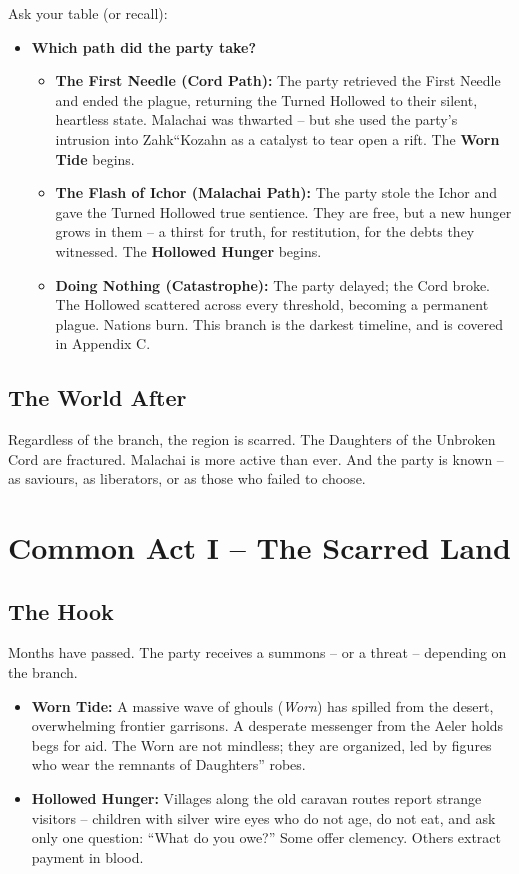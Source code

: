 \documentclass[10pt,twoside]{book}
\begin{document}
Ask your table (or recall):
\begin{itemize}
\item \textbf{Which path did the party take?}
  \begin{itemize}
  \item \textbf{The First Needle (Cord Path):} The party retrieved the First Needle and ended the plague, returning the Turned Hollowed to their silent, heartless state. Malachai was thwarted -- but she used the party's intrusion into Zahk``Kozahn as a catalyst to tear open a rift. The \textbf{Worn Tide} begins.
  \item \textbf{The Flash of Ichor (Malachai Path):} The party stole the Ichor and gave the Turned Hollowed true sentience. They are free, but a new hunger grows in them -- a thirst for truth, for restitution, for the debts they witnessed. The \textbf{Hollowed Hunger} begins.
  \item \textbf{Doing Nothing (Catastrophe):} The party delayed; the Cord broke. The Hollowed scattered across every threshold, becoming a permanent plague. Nations burn. This branch is the darkest timeline, and is covered in Appendix C.
  \end{itemize}
\end{itemize}

\section{The World After}
Regardless of the branch, the region is scarred. The Daughters of the Unbroken Cord are fractured. Malachai is more active than ever. And the party is known -- as saviours, as liberators, or as those who failed to choose.

\chapter{Common Act I -- The Scarred Land}

\section{The Hook}
Months have passed. The party receives a summons -- or a threat -- depending on the branch.

\begin{itemize}
\item \textbf{Worn Tide:} A massive wave of ghouls (\textit{Worn}) has spilled from the desert, overwhelming frontier garrisons. A desperate messenger from the Aeler holds begs for aid. The Worn are not mindless; they are organized, led by figures who wear the remnants of Daughters'' robes.
\item \textbf{Hollowed Hunger:} Villages along the old caravan routes report strange visitors -- children with silver wire eyes who do not age, do not eat, and ask only one question: ``What do you owe?'' Some offer clemency. Others extract payment in blood.
\end{itemize}
\end{document}

